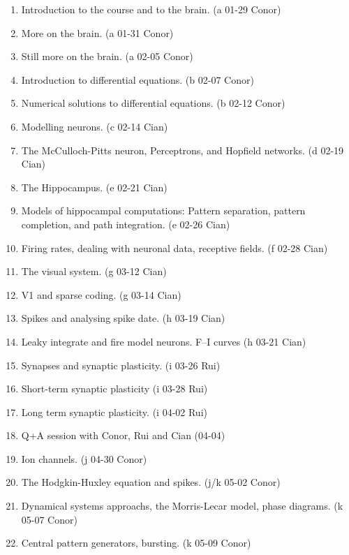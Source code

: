 \documentclass[11pt,a4paper]{scrartcl}
\begin{document}
\begin{enumerate}

\item Introduction to the course and to the brain. (a 01-29 Conor)
\item More on the brain. (a 01-31 Conor)
\item Still more on the brain. (a 02-05 Conor)

\item Introduction to differential equations. (b 02-07 Conor)
\item Numerical solutions to differential equations. (b 02-12 Conor)

\item Modelling neurons. (c 02-14 Cian)
\item The McCulloch-Pitts neuron, Perceptrons, and Hopfield networks. (d 02-19 Cian)

\item The Hippocampus. (e 02-21 Cian)
\item Models of hippocampal computations: Pattern separation, pattern completion, and path integration. (e 02-26 Cian)

\item Firing rates, dealing with neuronal data, receptive fields. (f 02-28 Cian)
\newline {}
  
\item The visual system. (g 03-12 Cian)

\item V1 and sparse coding. (g 03-14 Cian)
\item Spikes and analysing spike date. (h 03-19 Cian)

\item Leaky integrate and fire model neurons. F--I curves (h 03-21 Cian)
\item Synapses and synaptic plasticity. (i 03-26 Rui)
\item Short-term synaptic plasticity (i 03-28 Rui)
\item Long term synaptic plasticity. (i 04-02 Rui)
\item Q+A session with Conor, Rui and Cian (04-04)
\newline {}
  
\item Ion channels. (j 04-30 Conor)
\item The Hodgkin-Huxley equation and spikes. (j/k 05-02 Conor)

\item Dynamical systems approachs, the Morris-Lecar model, phase diagrams. (k 05-07 Conor)
\item Central pattern generators, bursting. (k 05-09 Conor)

\end{enumerate}
\end{document}
